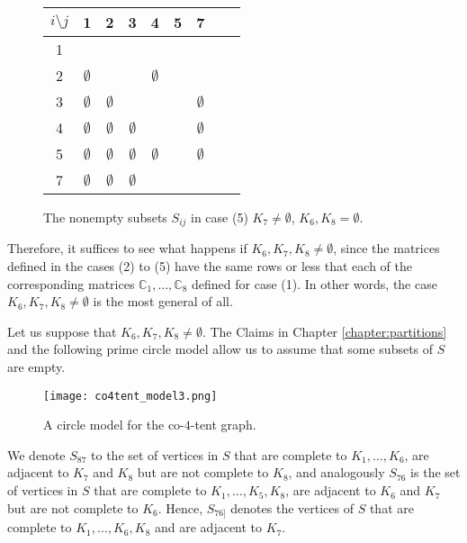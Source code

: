 \documentclass[12pt]{book}
\theoremstyle{plain}
\newcounter{cases}
\theoremstyle{remark}
\begin{document}
\begin{figure}[h!]	 
\begin{center}
	\begin{tabular}{ c | c c c c c c c c} 
		 \hline
		 $i\setminus j$ & 1 & 2 & 3 & 4 & 5 & 7 \\ 
		  \hline
		 1 & \checkmark & \checkmark & \checkmark & \checkmark & \checkmark & \checkmark \\ 
		 2 & $\emptyset$ & \checkmark & \checkmark & $\emptyset$ & \checkmark & \checkmark \\
 		 3 & $\emptyset$ & $\emptyset$ & \checkmark & \checkmark & \checkmark & $\emptyset$ \\
		 4 & $\emptyset$ & $\emptyset$ & $\emptyset$ & \checkmark & \checkmark & $\emptyset$ \\
		 5 & $\emptyset$ & $\emptyset$ & $\emptyset$ & $\emptyset$ & \checkmark & $\emptyset$ \\
		 7 & $\emptyset$  & $\emptyset$ & $\emptyset$  & \checkmark  & \checkmark & \checkmark \\
	\end{tabular}
\end{center} 
\caption{The nonempty subsets $S_{ij}$ in case (5) $K_7 \neq \emptyset$, $K_6, K_8 = \emptyset$.} \label{fig:tabla_co4tent_5}
\end{figure}

Therefore, it suffices to see what happens if $K_6, K_7, K_8 \neq \emptyset$, since the matrices defined in the cases (2) to (5) have the same rows or less that each of the corresponding matrices $\mathbb{C}_1, \ldots, \mathbb{C}_8$ defined for case (1). In other words, the case $K_6, K_7, K_8 \neq \emptyset$ is the most general of all. 

\vspace{2mm}
Let us suppose that $K_6, K_7, K_8 \neq \emptyset$.
The Claims in Chapter \ref{chapter:partitions} and the following prime circle model allow us to assume that some subsets of $S$ are empty.

\begin{figure}[h!]
\centering
\texttt{[image: co4tent\_model3.png]}
	  \caption{A circle model for the co-$4$-tent graph.} \label{fig:co4tent_model}    
\end{figure}




We denote $S_{87}$ to the set of vertices in $S$ that are complete to $K_1, \ldots, K_6$, are adjacent to $K_7$ and $K_8$ but are not complete to $K_8$, and analogously $S_{76}$ is the set of vertices in $S$ that are complete to $K_1, \ldots, K_5, K_8$, are adjacent to $K_6$ and $K_7$ but are not complete to $K_6$. Hence, $S_{76]}$ denotes the vertices of $S$ that are complete to $K_1, \ldots, K_6, K_8$ and are adjacent to $K_7$.
\end{document}
